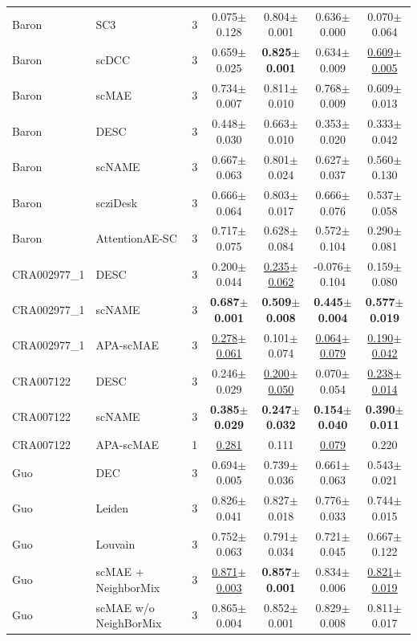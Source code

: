 \begin{table}[t]
\begin{tabular}{llrcccc}
Baron & SC3 & 3 & 0.075$\pm$0.128 & 0.804$\pm$0.001 & 0.636$\pm$0.000 & 0.070$\pm$0.064 \\
Baron & scDCC & 3 & 0.659$\pm$0.025 & \textbf{0.825$\pm$0.001} & 0.634$\pm$0.009 & \underline{0.609$\pm$0.005} \\
Baron & scMAE & 3 & 0.734$\pm$0.007 & 0.811$\pm$0.010 & 0.768$\pm$0.009 & 0.609$\pm$0.013 \\
Baron & DESC & 3 & 0.448$\pm$0.030 & 0.663$\pm$0.010 & 0.353$\pm$0.020 & 0.333$\pm$0.042 \\
Baron & scNAME & 3 & 0.667$\pm$0.063 & 0.801$\pm$0.024 & 0.627$\pm$0.037 & 0.560$\pm$0.130 \\
Baron & scziDesk & 3 & 0.666$\pm$0.064 & 0.803$\pm$0.017 & 0.666$\pm$0.076 & 0.537$\pm$0.058 \\
Baron & AttentionAE-SC & 3 & 0.717$\pm$0.075 & 0.628$\pm$0.084 & 0.572$\pm$0.104 & 0.290$\pm$0.081 \\
\midrule
CRA002977\_1 & DESC & 3 & 0.200$\pm$0.044 & \underline{0.235$\pm$0.062} & -0.076$\pm$0.104 & 0.159$\pm$0.080 \\
CRA002977\_1 & scNAME & 3 & \textbf{0.687$\pm$0.001} & \textbf{0.509$\pm$0.008} & \textbf{0.445$\pm$0.004} & \textbf{0.577$\pm$0.019} \\
CRA002977\_1 & APA-scMAE & 3 & \underline{0.278$\pm$0.061} & 0.101$\pm$0.074 & \underline{0.064$\pm$0.079} & \underline{0.190$\pm$0.042} \\
\midrule
CRA007122 & DESC & 3 & 0.246$\pm$0.029 & \underline{0.200$\pm$0.050} & 0.070$\pm$0.054 & \underline{0.238$\pm$0.014} \\
CRA007122 & scNAME & 3 & \textbf{0.385$\pm$0.029} & \textbf{0.247$\pm$0.032} & \textbf{0.154$\pm$0.040} & \textbf{0.390$\pm$0.011} \\
CRA007122 & APA-scMAE & 1 & \underline{0.281} & 0.111 & \underline{0.079} & 0.220 \\
\midrule
Guo & DEC & 3 & 0.694$\pm$0.005 & 0.739$\pm$0.036 & 0.661$\pm$0.063 & 0.543$\pm$0.021 \\
Guo & Leiden & 3 & 0.826$\pm$0.041 & 0.827$\pm$0.018 & 0.776$\pm$0.033 & 0.744$\pm$0.015 \\
Guo & Louvain & 3 & 0.752$\pm$0.063 & 0.791$\pm$0.034 & 0.721$\pm$0.045 & 0.667$\pm$0.122 \\
Guo & scMAE + NeighborMix & 3 & \underline{0.871$\pm$0.003} & \textbf{0.857$\pm$0.001} & 0.834$\pm$0.006 & \underline{0.821$\pm$0.019} \\
Guo & scMAE w/o NeighBorMix & 3 & 0.865$\pm$0.004 & 0.852$\pm$0.001 & 0.829$\pm$0.008 & 0.811$\pm$0.017 \\

\end{tabular}
\end{table}
